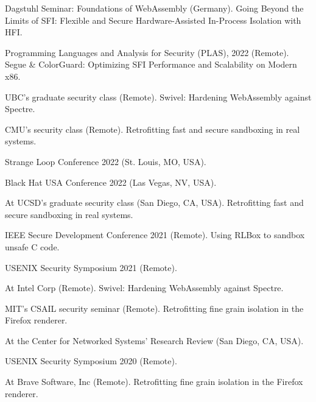 { Dagstuhl Seminar:
{Foundations of WebAssembly} (Germany). Going Beyond the Limits of SFI: Flexible and
Secure Hardware-Assisted In-Process Isolation with HFI. }

{ Programming Languages and Analysis for Security (PLAS), 2022 (Remote). Segue \&
ColorGuard: Optimizing SFI Performance and Scalability on Modern x86. }

{ UBC's graduate security class (Remote). Swivel: Hardening WebAssembly against
Spectre. }

{ CMU's security class (Remote). Retrofitting fast and secure sandboxing in real
systems. }

{ Strange Loop Conference 2022  (St. Louis, MO, USA).
}

{ Black Hat USA Conference 2022 (Las Vegas, NV, USA).
}

{ At UCSD's graduate security class (San Diego, CA, USA). Retrofitting fast and secure sandboxing in
real systems. }

{ IEEE Secure Development Conference 2021 (Remote). Using RLBox to sandbox unsafe C
code. }

{ USENIX Security Symposium 2021 (Remote).
}

{ At Intel Corp (Remote). Swivel: Hardening WebAssembly against Spectre. }

{ MIT's CSAIL security seminar (Remote). Retrofitting fine grain isolation in the
Firefox renderer. }

{ At the Center for Networked Systems' Research Review (San Diego, CA, USA).
}

{ USENIX Security Symposium 2020 (Remote).
}

{ At Brave Software, Inc (Remote). Retrofitting fine grain isolation in the Firefox
renderer. }
